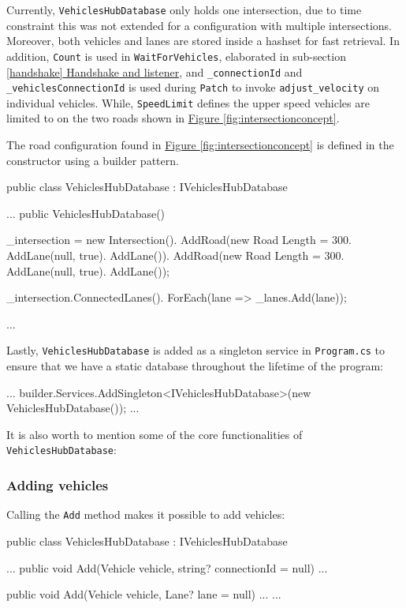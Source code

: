 Currently, \verb|VehiclesHubDatabase| only holds one intersection, due to time constraint this was not extended for a configuration with multiple intersections. Moreover, both vehicles and lanes are stored inside a hashset for fast retrieval. In addition, \verb|Count| is used in \verb|WaitForVehicles|, elaborated in sub-section \hyperref[handshake]{\ref{handshake} Handshake and listener}, and \verb|_connectionId| and \verb|_vehiclesConnectionId| is used during \verb|Patch| to invoke \verb|adjust_velocity| on individual vehicles. While, \verb|SpeedLimit| defines the upper speed vehicles are limited to on the two roads shown in \hyperref[fig:intersectionconcept]{Figure \ref{fig:intersectionconcept}}.

The road configuration found in \hyperref[fig:intersectionconcept]{Figure \ref{fig:intersectionconcept}} is defined in the constructor using a builder pattern.
\begin{csharp}
public class VehiclesHubDatabase : IVehiclesHubDatabase
{
	...
	public VehiclesHubDatabase()
	{
		_intersection = new Intersection().
			AddRoad(new Road {Length = 300}.
				AddLane(null, true).
				AddLane()).
		AddRoad(new Road {Length = 300}.
				AddLane(null, true).
				AddLane());
		
		_intersection.ConnectedLanes().
			ForEach(lane => _lanes.Add(lane));
	}
	...
}
\end{csharp}

Lastly, \verb|VehiclesHubDatabase| is added as a singleton service in \verb|Program.cs| to ensure that we have a static database throughout the lifetime of the program:
\begin{csharp}
...
builder.Services.AddSingleton<IVehiclesHubDatabase>(new VehiclesHubDatabase());
...
\end{csharp}

It is also worth to mention some of the core  functionalities of \verb|VehiclesHubDatabase|:

\subsubsection{Adding vehicles}
Calling the \verb|Add| method makes it possible to add vehicles:
\begin{csharp}
public class VehiclesHubDatabase : IVehiclesHubDatabase
{
	...
	public void Add(Vehicle vehicle, string? connectionId = null) {...}
	
	public void Add(Vehicle vehicle, Lane? lane = null) {...}
	...
}
\end{csharp}

